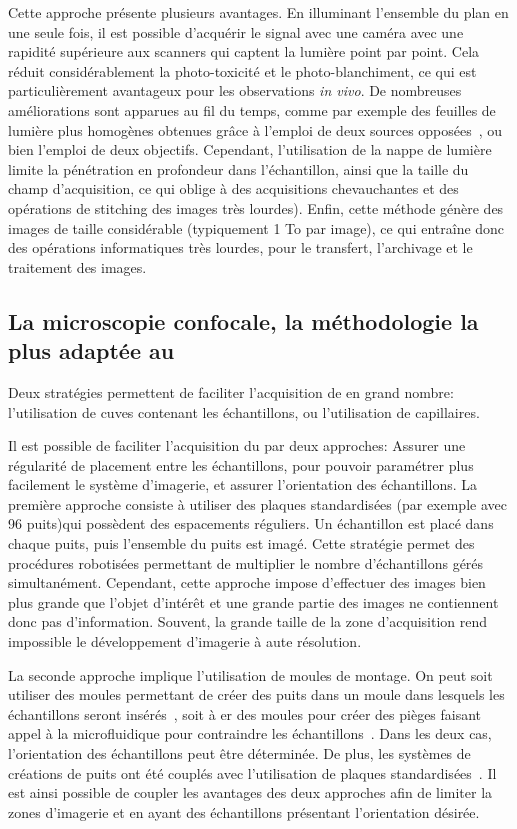 \documentclass[\main/main.tex]{subfiles}
\begin{document}
Cette approche présente plusieurs avantages. En illuminant l'ensemble du plan en une seule fois, il est possible d'acquérir le signal avec une caméra avec une rapidité supérieure aux scanners qui captent la lumière point par point.
Cela réduit considérablement la photo-toxicité et le photo\hyp{}blanchiment, ce qui est particulièrement avantageux pour les observations  \textit{in vivo}.
%
De nombreuses améliorations sont apparues au fil du temps, comme par exemple des feuilles de lumière plus homogènes obtenues grâce à l'emploi de deux sources opposées~\cite{huisken_2007}, ou bien l'emploi de deux objectifs.
%
Cependant, l'utilisation de la nappe de lumière limite la pénétration en profondeur dans l'échantillon, ainsi que la taille du champ d'acquisition, ce qui oblige à des acquisitions chevauchantes et des opérations de stitching des images très lourdes). Enfin, cette méthode génère des images de taille considérable (typiquement 1 To par image), ce qui entraîne donc des opérations informatiques très lourdes, pour le transfert, l'archivage et le traitement des images.

    \subsection{La microscopie confocale, la méthodologie la plus adaptée au \hcs{}}
    
Deux stratégies  permettent de faciliter l'acquisition de \pz{} en grand nombre: l'utilisation de cuves contenant les échantillons, ou l'utilisation de capillaires.
   
%
Il est possible de faciliter l'acquisition du \pz{} par deux approches:
Assurer une régularité de placement entre les échantillons,
pour pouvoir paramétrer plus facilement le système d'imagerie, et assurer l'orientation des échantillons.
%
La première approche consiste à utiliser des plaques standardisées (par exemple avec 96 puits)qui possèdent des espacements réguliers. Un échantillon est placé dans chaque puits, puis l'ensemble du puits est imagé. Cette stratégie permet des procédures robotisées permettant de multiplier le nombre d'échantillons gérés simultanément.
%
Cependant, cette approche impose d'effectuer des images bien plus grande que l'objet d'intérêt et une grande partie des images ne contiennent donc pas d'information. Souvent, la grande taille de la zone d'acquisition rend impossible le développement d'imagerie à aute résolution.

%
\label{sec:moule_montage}
La seconde approche implique l'utilisation de moules de montage.
%
On peut soit utiliser des moules permettant de créer des puits dans un moule dans lesquels les échantillons seront insérés~\cite{donoughe_2018,kleinhans_2019}, soit à er des moules pour créer des pièges faisant appel à la microfluidique pour contraindre les échantillons~\cite{khalili_2019}. Dans les deux cas, l'orientation des échantillons peut être déterminée.
%
De plus, les systèmes de créations de puits ont été couplés avec l'utilisation de plaques standardisées~\cite{wittbrodt_2014}.
%
Il est ainsi possible de coupler les avantages des deux approches afin de limiter la zones d'imagerie et en ayant des échantillons présentant l'orientation désirée.
\end{document}
